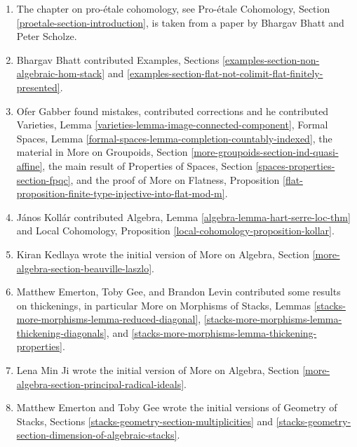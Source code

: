 \begin{enumerate}
\ref{examples-section-non-descending-property-projective},
\ref{examples-section-non-effective-descent-projective},
and
Properties of Stacks, Section \ref{stacks-properties-section-dimension}.
\item The chapter on pro-\'etale cohomology, see
Pro-\'etale Cohomology, Section \ref{proetale-section-introduction},
is taken from a paper by Bhargav Bhatt and Peter Scholze.
\item Bhargav Bhatt contributed Examples, Sections
\ref{examples-section-non-algebraic-hom-stack} and
\ref{examples-section-flat-not-colimit-flat-finitely-presented}.
\item Ofer Gabber found mistakes, contributed corrections and he
contributed
Varieties, Lemma \ref{varieties-lemma-image-connected-component},
Formal Spaces, Lemma \ref{formal-spaces-lemma-completion-countably-indexed},
the material in
More on Groupoids, Section \ref{more-groupoids-section-ind-quasi-affine},
the main result of
Properties of Spaces, Section \ref{spaces-properties-section-fpqc},
and the proof of
More on Flatness, Proposition
\ref{flat-proposition-finite-type-injective-into-flat-mod-m}.
\item J\'anos Koll\'ar contributed
Algebra, Lemma \ref{algebra-lemma-hart-serre-loc-thm} and
Local Cohomology, Proposition \ref{local-cohomology-proposition-kollar}.
\item Kiran Kedlaya wrote the initial version of
More on Algebra, Section \ref{more-algebra-section-beauville-laszlo}.
\item Matthew Emerton, Toby Gee, and Brandon Levin contributed
some results on thickenings, in particular
More on Morphisms of Stacks, Lemmas
\ref{stacks-more-morphisms-lemma-reduced-diagonal},
\ref{stacks-more-morphisms-lemma-thickening-diagonals}, and
\ref{stacks-more-morphisms-lemma-thickening-properties}.
\item Lena Min Ji wrote the initial version of
More on Algebra, Section \ref{more-algebra-section-principal-radical-ideals}.
\item Matthew Emerton and Toby Gee wrote the initial versions of
Geometry of Stacks,
Sections \ref{stacks-geometry-section-multiplicities} and
\ref{stacks-geometry-section-dimension-of-algebraic-stacks}.
\end{enumerate}










